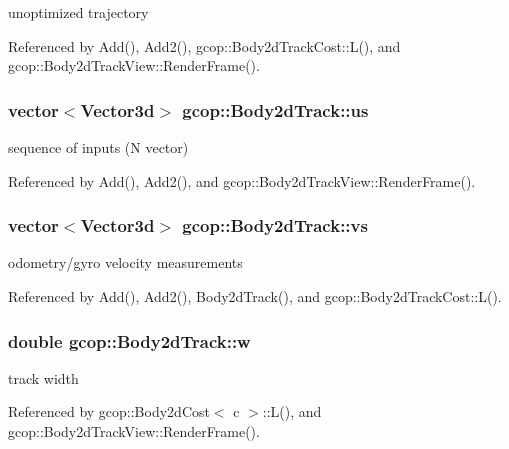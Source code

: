 unoptimized trajectory 



\-Referenced by \-Add(), \-Add2(), gcop\-::\-Body2d\-Track\-Cost\-::\-L(), and gcop\-::\-Body2d\-Track\-View\-::\-Render\-Frame().

\subsubsection[{us}]{\setlength{\rightskip}{0pt plus 5cm}vector$<$\-Vector3d$>$ {\bf gcop\-::\-Body2d\-Track\-::us}}\label{classgcop_1_1Body2dTrack_aea1b855c00a56729b6895287f6d22a35}


sequence of inputs (\-N vector) 



\-Referenced by \-Add(), \-Add2(), and gcop\-::\-Body2d\-Track\-View\-::\-Render\-Frame().

\subsubsection[{vs}]{\setlength{\rightskip}{0pt plus 5cm}vector$<$\-Vector3d$>$ {\bf gcop\-::\-Body2d\-Track\-::vs}}\label{classgcop_1_1Body2dTrack_af0e7d5251579442de064418c5a2ae593}


odometry/gyro velocity measurements 



\-Referenced by \-Add(), \-Add2(), \-Body2d\-Track(), and gcop\-::\-Body2d\-Track\-Cost\-::\-L().

\subsubsection[{w}]{\setlength{\rightskip}{0pt plus 5cm}double {\bf gcop\-::\-Body2d\-Track\-::w}}\label{classgcop_1_1Body2dTrack_a4dc202c7ad3ee5e459230bd809966b69}


track width 



\-Referenced by gcop\-::\-Body2d\-Cost$<$ c $>$\-::\-L(), and gcop\-::\-Body2d\-Track\-View\-::\-Render\-Frame().

